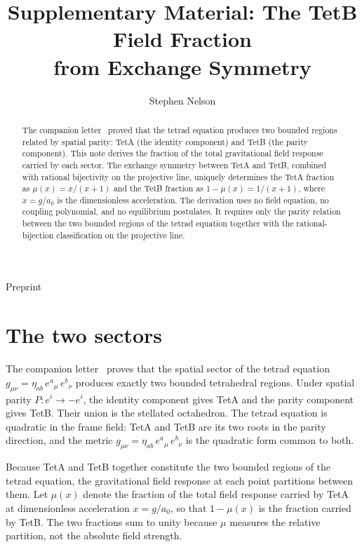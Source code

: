 \documentclass[twocolumn]{iopjournal}
\renewcommand{\articletype}[1]{%
  {\vspace*{-8mm}\noindent \Large \sf Preprint}\par
  \vspace*{6mm}\noindent{\scriptsize \sf{\bfseries \MakeUppercase{#1}}}}
\begin{document}
\articletype{Supplementary Material}

\title{Supplementary Material: The TetB Field Fraction\\
from Exchange Symmetry}

\author{Stephen Nelson}



\begin{abstract}
The companion letter~\cite{Nelson2026a} proved that the tetrad
equation produces two bounded regions related by spatial parity:
TetA (the identity component) and TetB (the parity component).
This note derives the fraction of the total gravitational field
response carried by each sector. The exchange symmetry between
TetA and TetB, combined with rational bijectivity on the
projective line, uniquely determines the TetA fraction as
$\mu(x) = x/(x+1)$ and the TetB fraction as
$1 - \mu(x) = 1/(x+1)$, where $x = g/a_0$ is the
dimensionless acceleration. The derivation uses no field
equation, no coupling polynomial, and no equilibrium
postulates. It requires only the parity relation between the
two bounded regions of the tetrad equation together with the
rational-bijection classification on the projective line.
\end{abstract}


\section*{The two sectors}

The companion letter~\cite{Nelson2026a} proves that the
spatial sector of the tetrad equation
$g_{\mu\nu} = \eta_{ab}\,e^a{}_\mu\,e^b{}_\nu$ produces
exactly two bounded tetrahedral regions. Under spatial parity
$P: e^i \to -e^i$, the identity component gives TetA and the
parity component gives TetB. Their union is the stellated
octahedron. The tetrad equation is quadratic in the frame
field: TetA and TetB are its two roots in the parity
direction, and the metric
$g_{\mu\nu} = \eta_{ab}\,e^a{}_\mu\,e^b{}_\nu$ is the
quadratic form common to both.

Because TetA and TetB together constitute the two bounded
regions of the tetrad equation, the gravitational field
response at each point partitions between them. Let $\mu(x)$
denote the fraction of the total field response carried by
TetA at dimensionless acceleration $x = g/a_0$, so that
$1 - \mu(x)$ is the fraction carried by TetB. The two fractions
sum to
unity because $\mu$ measures the relative partition, not the
absolute field strength.
\end{document}

